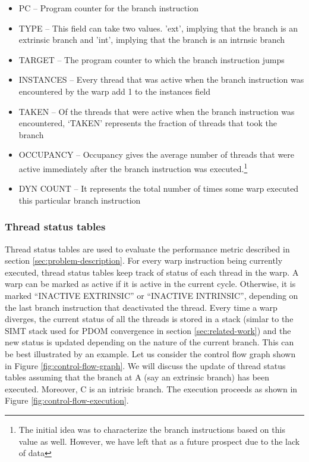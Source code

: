 \begin{itemize}
	\item PC -- Program counter for the branch instruction
	\item TYPE -- This field can take two values. 'ext', implying that the branch is an extrinsic branch and 'int', implying that the branch is an intrnsic branch 
	\item TARGET -- The program counter to which the branch instruction jumps
	\item INSTANCES -- Every thread that was active when the branch instruction was encountered by the warp add 1 to the instances field
	\item TAKEN -- Of the threads that were active when the branch instruction was encountered, `TAKEN' represents the fraction of threads that took the branch
	\item OCCUPANCY -- Occupancy gives the average number of threads that were active immediately after the branch instruction was executed.\footnote{The initial idea was to characterize the branch instructions based on this value as well. However, we have left that as a future prospect due to the lack of data}
	\item DYN COUNT -- It represents the total number of times some warp executed this particular branch instruction
\end{itemize}

	\subsubsection*{Thread status tables}
	Thread status tables are used to evaluate the performance metric described in section \ref{sec:problem-description}. For every warp instruction being currently executed, thread status tables keep track of status of each thread in the warp. A warp can be marked as active if it is active in the current cycle. Otherwise, it is marked ``INACTIVE EXTRINSIC'' or ``INACTIVE INTRINSIC'', depending on the last branch instruction that deactivated the thread. Every time a warp diverges, the current status of all the threads is stored in a stack (simlar to the SIMT stack used for PDOM convergence in section \ref{sec:related-work}) and the new status is updated depending on the nature of the current branch. This can be best illustrated by an example. Let us consider the control flow graph shown in Figure \ref{fig:control-flow-graph}. We will discuss the update of thread status tables assuming that the branch at A (say an extrinsic branch) has been executed. Moreover, C is an intrisic branch. The execution proceeds as shown in Figure \ref{fig:control-flow-execution}.

